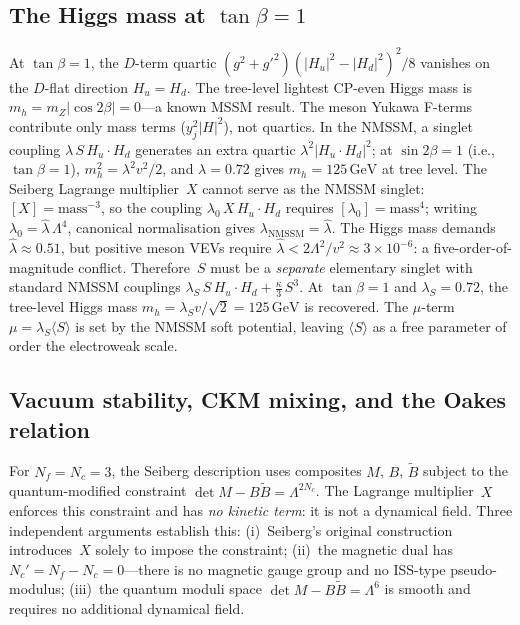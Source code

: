 \documentclass[12pt,a4paper]{article}
\newcommand{\GeV}{\,\text{GeV}}
\begin{document}
\subsection{The Higgs mass at $\tan\beta = 1$}
\label{subsec:higgs_open}
At $\tan\beta = 1$, the $D$-term quartic
$(g^2+g'^2)(|H_u|^2 - |H_d|^2)^2/8$ vanishes on the
$D$-flat direction $H_u = H_d$.  The tree-level lightest
CP-even Higgs mass is $m_h = m_Z|\cos 2\beta| = 0$---a known
MSSM result. The meson Yukawa F-terms contribute only mass
terms ($y_j^2|H|^2$), not quartics.
In the NMSSM, a singlet coupling
$\lambda\,S\,H_u\!\cdot\!H_d$ generates an extra quartic
$\lambda^2|H_u\!\cdot\!H_d|^2$; at $\sin 2\beta = 1$ (i.e.,
$\tan\beta = 1$), $m_h^2 = \lambda^2 v^2/2$, and
$\lambda = 0.72$ gives $m_h = 125\GeV$ at tree level.
The Seiberg Lagrange multiplier~$X$ cannot serve as the NMSSM
singlet: $[X] = \text{mass}^{-3}$, so the coupling
$\lambda_0\,X\,H_u\!\cdot\!H_d$ requires
$[\lambda_0] = \text{mass}^4$; writing
$\lambda_0 = \hat\lambda\,\Lambda^4$, canonical normalisation
gives $\lambda_{\text{NMSSM}} = \hat\lambda$.  The Higgs mass
demands $\hat\lambda \approx 0.51$, but positive meson VEVs
require $\hat\lambda < 2\Lambda^2/v^2 \approx 3\times 10^{-6}$:
a five-order-of-magnitude conflict.  Therefore~$S$ must be a
\emph{separate} elementary singlet with standard NMSSM couplings
$\lambda_S\,S\,H_u\!\cdot\!H_d + \tfrac{\kappa}{3}\,S^3$.
At $\tan\beta = 1$ and $\lambda_S = 0.72$, the tree-level
Higgs mass $m_h = \lambda_S v/\sqrt{2} = 125\GeV$ is recovered.
The $\mu$-term $\mu = \lambda_S\langle S\rangle$ is set by the
NMSSM soft potential, leaving $\langle S\rangle$ as a free
parameter of order the electroweak scale.

\subsection{Vacuum stability, CKM mixing, and the Oakes relation}
\label{subsec:ckm_open}

For $N_f = N_c = 3$, the Seiberg description uses
composites $M$, $B$, $\tilde B$ subject to the quantum-modified
constraint $\det M - B\tilde B = \Lambda^{2N_c}$.  The
Lagrange multiplier~$X$ enforces this constraint and has
\emph{no kinetic term}: it is not a dynamical field.
Three independent arguments establish this:
(i)~Seiberg's original construction~\cite{Seiberg:1994bz}
    introduces~$X$ solely to impose the constraint;
(ii)~the magnetic dual has $N_c' = N_f - N_c = 0$---there is no
    magnetic gauge group and no ISS-type pseudo-modulus;
(iii)~the quantum moduli space $\det M - B\tilde B = \Lambda^6$
    is smooth and requires no additional dynamical field.
\end{document}
